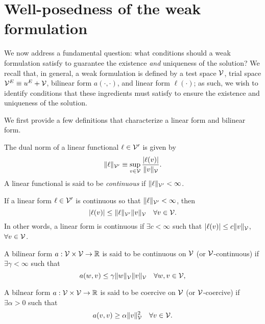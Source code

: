 \section{Well-posedness of the weak formulation}
\label{sec:var_wellposedness}
We now address a fundamental question: what conditions should a weak formulation satisfy to guarantee the existence \emph{and} uniqueness of the solution?  We recall that, in general, a weak formulation is defined by a test space $\mathcal{V}$, trial space $\mathcal{V}^E \equiv u^E + \mathcal{V}$, bilinear form $a(\cdot,\cdot)$, and linear form $\ell(\cdot)$; as such, we wish to identify conditions that these ingredients must satisfy to ensure the existence and uniqueness of the solution.

We first provide a few definitions that characterize a linear form and bilinear form.
\begin{definition}
  The dual norm of a linear functional $\ell \in \mathcal{V}'$ is given by
  \begin{equation*}
    \| \ell \|_{\mathcal{V}'} \equiv \sup_{v \in \mathcal{V}} \frac{|\ell(v)|}{\| v \|_{\mathcal{V}}}.
  \end{equation*}
  A linear functional is said to be \emph{continuous} if $\| \ell \|_{\mathcal{V}'} < \infty$.
\end{definition}
\begin{corollary}
  If a linear form $\ell \in \mathcal{V}'$ is continuous so that $\| \ell \|_{\mathcal{V}'} < \infty$, then
  \begin{equation*}
    |\ell(v)| \leq \| \ell \|_{\mathcal{V}'} \| v \|_{\mathcal{V}} \quad \forall v \in \mathcal{V}.
  \end{equation*}
  In other words, a linear form is continuous if $\exists c < \infty$ such that $| \ell(v) | \leq c \| v \|_{\mathcal{V}}$, $\forall v \in \mathcal{V}$.
\end{corollary}
\begin{definition}[continuity]
  \label{def:th_continuity}
  A bilinear form $a: \mathcal{V} \times \mathcal{V} \to \mathbb{R}$ is said to be continuous on $\mathcal{V}$ (or $\mathcal{V}$-continuous) if $\exists \gamma < \infty$ such that 
  \begin{equation*}
    a(w,v) \leq \gamma \| w \|_{\mathcal{V}} \| v \|_{\mathcal{V}} \quad \forall w,v \in \mathcal{V},
  \end{equation*}
\end{definition}
\begin{definition}[coercivity]
  \label{def:th_coercivity}
  A bilnear form $a: \mathcal{V} \times \mathcal{V} \to \mathbb{R}$ is said to be coercive on $\mathcal{V}$ (or $\mathcal{V}$-coercive) if $\exists \alpha > 0$ such that 
  \begin{equation*}
    a(v,v) \geq \alpha \| v \|_{\mathcal{V}}^2 \quad \forall v \in \mathcal{V}.
  \end{equation*}
\end{definition}

